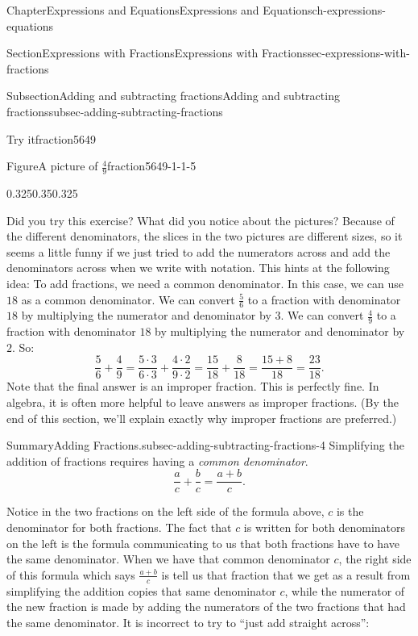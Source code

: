 \documentclass[twoside,11pt,]{book}
\numberwithin{equation}{chapter}
\begin{document}
\begin{chapterptx}{Chapter}{Expressions and Equations}{}{Expressions and Equations}{}{}{ch-expressions-equations}
\begin{sectionptx}{Section}{Expressions with Fractions}{}{Expressions with Fractions}{}{}{sec-expressions-with-fractions}
\begin{subsectionptx}{Subsection}{Adding and subtracting fractions}{}{Adding and subtracting fractions}{}{}{subsec-adding-subtracting-fractions}
\begin{inlineexercise}{Try it}{}{fraction5649}
\begin{figureptx}{Figure}{A picture of \(\frac49\)}{fraction5649-1-1-5}{}
\begin{image}{0.325}{0.35}{0.325}{}
{%
}%
\end{image}%
\tcblower
\end{figureptx}%
%
\end{inlineexercise}%
Did you try this exercise? What did you notice about the pictures? Because of the different denominators, the slices in the two pictures are different sizes, so it seems a little funny if we just tried to add the numerators across and add the denominators across when we write with notation. This hints at the following idea: To add fractions, we need a common denominator. In this case, we can use \(18\) as a common denominator. We can convert \(\frac56\) to a fraction with denominator \(18\) by multiplying the numerator and denominator by \(3\). We can convert \(\frac49\) to a fraction with denominator \(18\) by multiplying the numerator and denominator by \(2\). So:%
\begin{equation*}
\frac56+\frac49=\frac{5 \cdot 3}{6 \cdot 3}+\frac{4 \cdot 2}{9 \cdot 2}=\frac{15}{18}+\frac{8}{18}=\frac{15+8}{18}=\frac{23}{18}.
\end{equation*}
Note that the final answer is an improper fraction. This is perfectly fine. In algebra, it is often more helpful to leave answers as improper fractions. (By the end of this section, we'll explain exactly why improper fractions are preferred.)%
\begin{assemblage}{Summary}{Adding Fractions.}{subsec-adding-subtracting-fractions-4}%
Simplifying the addition of fractions requires having a \emph{common denominator}.%
\begin{equation*}
\frac{a}{c}+\frac{b}{c} = \frac{a + b}{c}.
\end{equation*}
%
\end{assemblage}
Notice in the two fractions on the left side of the formula above, \(c\) is the denominator for both fractions. The fact that \(c\) is written for both denominators on the left is the formula communicating to us that both fractions have to have the same denominator. When we have that common denominator \(c\), the right side of this formula which says \(\frac{a+b}{c}\) is tell us that fraction that we get as a result from simplifying the addition copies that same denominator \(c\), while the numerator of the new fraction is made by adding the numerators of the two fractions that had the same denominator. It is incorrect to try to ``just add straight across'':%

\end{subsectionptx}
\end{sectionptx}
\end{chapterptx}
\end{document}
